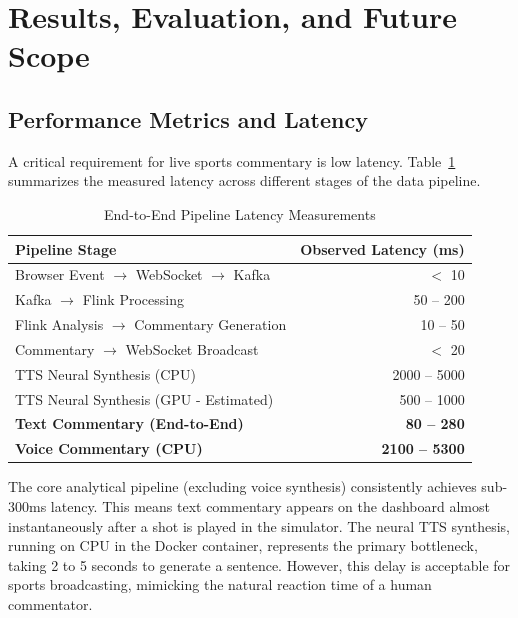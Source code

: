 \section{Results, Evaluation, and Future Scope}

\subsection{Performance Metrics and Latency}

A critical requirement for live sports commentary is low latency. Table~\ref{tab:latency} summarizes the measured latency across different stages of the data pipeline.

\begin{table}[H]
\centering
\caption{End-to-End Pipeline Latency Measurements}
\label{tab:latency}
\begin{tabular}{@{}lr@{}}
\toprule
\textbf{Pipeline Stage} & \textbf{Observed Latency (ms)} \\
\midrule
Browser Event $\rightarrow$ WebSocket $\rightarrow$ Kafka & $<$ 10 \\
Kafka $\rightarrow$ Flink Processing & 50 -- 200 \\
Flink Analysis $\rightarrow$ Commentary Generation & 10 -- 50 \\
Commentary $\rightarrow$ WebSocket Broadcast & $<$ 20 \\
\midrule
TTS Neural Synthesis (CPU) & 2000 -- 5000 \\
TTS Neural Synthesis (GPU - Estimated) & 500 -- 1000 \\
\midrule
\textbf{Text Commentary (End-to-End)} & \textbf{80 -- 280} \\
\textbf{Voice Commentary (CPU)} & \textbf{2100 -- 5300} \\
\bottomrule
\end{tabular}
\end{table}

The core analytical pipeline (excluding voice synthesis) consistently achieves sub-300ms latency. This means text commentary appears on the dashboard almost instantaneously after a shot is played in the simulator. The neural TTS synthesis, running on CPU in the Docker container, represents the primary bottleneck, taking 2 to 5 seconds to generate a sentence. However, this delay is acceptable for sports broadcasting, mimicking the natural reaction time of a human commentator.

